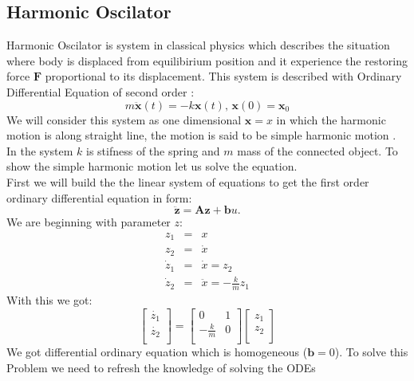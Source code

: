 \subsection{Harmonic Oscilator}
Harmonic Oscilator is  system  in classical physics which describes the situation where body is displaced from equilibirium position and it experience the restoring force $\mathbf{F}$ proportional to its displacement.\cite{osci2} This system is described with Ordinary Differential Equation of second order : 
\begin{equation}
	m\ddot{\mathbf{x}}(t) = -k\mathbf{x}(t) \texttt{,   } \mathbf{x}(0)= \mathbf{x}_0
\end{equation}
We will consider this system as one dimensional $\mathbf{x}= x$
in which the harmonic motion is along straight line, the motion is said to be simple harmonic motion \cite{osci}. In the system $k$ is stifness of the spring and $m$ mass of the connected object.  To show the simple harmonic motion let us solve the equation.\\
First we will build the the linear system of equations to get the first order ordinary differential equation in form: \begin{equation}
	\ddot{\mathbf{z}}= \mathbf{A}\mathbf{z} + \mathbf{b}u.
\end{equation}
We are beginning with parameter $z$:
\begin{eqnarray}
	z_1 &=& x\\
	z_2 &=& \dot{x}\\
	\dot{z}_1 &=& \dot{x} = z_2\\
	\dot{z}_2 &=& \ddot{x} = -\frac{k}{m}z_1 
\end{eqnarray}
With this we got:
\begin{equation}
	\begin{bmatrix}
		\dot{z_1}\\
		\dot{z_2}\\
	\end{bmatrix} = \begin{bmatrix}
	0 & 1\\
	-\frac{k}{m} & 0\\
	\end{bmatrix}
	\begin{bmatrix}
		z_1\\
		z_2\\
	\end{bmatrix}
\end{equation}
We got differential ordinary equation which is homogeneous ($\mathbf{b}=0$). To solve this Problem we need to refresh the knowledge of solving the ODEs 

